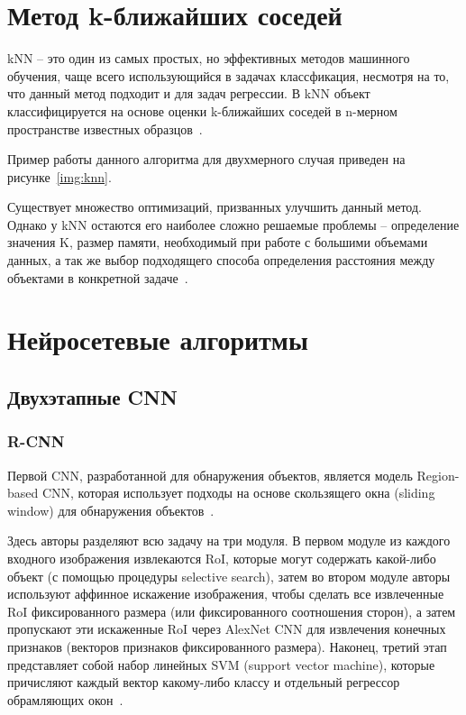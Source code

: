 \section{Метод k-ближайших соседей}

kNN -- это один из самых простых, но эффективных методов машинного обучения, чаще всего использующийся в задачах классфикация, несмотря на то, что данный метод подходит и для задач регрессии. В kNN объект классифицируется на основе оценки k-ближайших соседей в n-мерном пространстве известных образцов~\cite{knn-introduction}.

Пример работы данного алгоритма для двухмерного случая приведен на рисунке~\ref{img:knn}.


Существует множество оптимизаций, призванных улучшить данный метод. Однако у kNN остаются его наиболее сложно решаемые проблемы -- определение значения K, размер памяти, необходимый при работе с большими объемами данных, а так же выбор подходящего способа определения расстояния между объектами в конкретной задаче~\cite{knn-brief}. 

\section{Нейросетевые алгоритмы}

\subsection{Двухэтапные CNN}

\subsubsection*{R-CNN}

Первой CNN, разработанной для обнаружения объектов, является модель Region-based CNN, которая использует подходы на основе скользящего окна (sliding window) для обнаружения объектов~\cite{r-cnn}.

Здесь авторы разделяют всю задачу на три модуля. В первом модуле из каждого входного изображения извлекаются RoI, которые могут содержать какой-либо объект (с помощью процедуры selective search), затем во втором модуле авторы используют аффинное искажение изображения, чтобы сделать все извлеченные RoI фиксированного размера (или фиксированного соотношения сторон), а затем пропускают эти искаженные RoI через AlexNet CNN для извлечения конечных признаков (векторов признаков фиксированного размера). Наконец, третий этап представляет собой набор линейных SVM (support vector machine), которые причисляют каждый вектор какому-либо классу и отдельный регрессор обрамляющих окон~\cite{r-cnn}.

